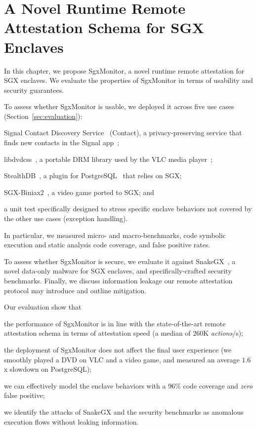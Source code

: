 \chapter{A Novel Runtime Remote Attestation Schema for SGX Enclaves} %
\label{chp:runtime-protection-trusted} 


In this chapter, we propose SgxMonitor, a novel runtime remote attestation for 
SGX enclaves.
We evaluate the properties of SgxMonitor in terms of usability and security 
guarantees.

To assess whether SgxMonitor is usable, we deployed it across five use 
cases (Section~\ref{sec:evaluation}):
\begin{enumerate*}[label=(\roman*)]
	\item Signal Contact Discovery Service~\citep{signalrepo} 
	(\textsf{Contact}), a privacy-preserving service that finds new contacts in 
	the Signal app~\citep{signalapp};
	\item \textsf{libdvdcss}~\citep{libdvdcss}, a portable DRM library used by 
	the VLC media player~\citep{videolan};
	\item \textsf{StealthDB}~\citep{stealthdb}, a plugin for 
	PostgreSQL~\citep{momjian2001postgresql} that relies on SGX;
	\item \textsf{SGX-Biniax2}~\citep{bauman2016case}, a video game 
	ported to SGX; and
	\item a \textsf{unit test} specifically designed to stress specific 
	enclave behaviors not covered by the other use cases (\ie exception 
	handling).
\end{enumerate*}
In particular, we measured micro- and macro-benchmarks, code symbolic
execution and static analysis code coverage, and false positive rates.

To assess whether SgxMonitor is secure, we evaluate
it against SnakeGX~\citep{snakegx}, a novel data-only malware for SGX
enclaves, and specifically-crafted security benchmarks. 
Finally, we discuss information leakage our remote attestation protocol may
introduce and outline mitigation.

Our evaluation show that 
\begin{enumerate*}[label=(\roman*)]
	\item the performance of SgxMonitor is in line with the state-of-the-art
	remote attestation schema in terms of attestation speed (a median of $260$K 
	\emph{actions}/s);
	\item the deployment of SgxMonitor does not affect the final user 
	experience (\eg we smoothly played a DVD on VLC and a video game, and 
	measured an average $1.6$x slowdown on PostgreSQL);
	\item we can effectively model the enclave behaviors with a 96\% code
	coverage and \emph{zero} false positive;
	\item we identify the attacks of SnakeGX and the security benchmarks as 
	anomalous execution
	flows without leaking information.
\end{enumerate*}

